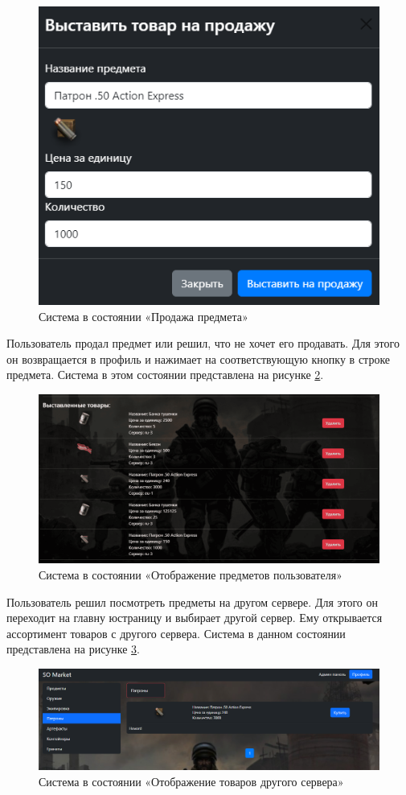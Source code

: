 \begin{figure}
	\centering
	\includegraphics[width=0.7\linewidth]{images/sell_on_web}
	\caption{Система в состоянии «Продажа предмета»}
	\label{fig:sellonweb}
\end{figure}

Пользователь продал предмет или решил, что не хочет его продавать. Для этого он возвращается в профиль и нажимает на соответствующую кнопку в строке предмета. Система в этом состоянии представлена на рисунке \ref{fig:profileitemweb}.

\begin{figure}[ht]
	\centering
	\includegraphics[width=0.7\linewidth]{images/profile_item_web}
	\caption{Система в состоянии «Отображение предметов пользователя»}
	\label{fig:profileitemweb}
\end{figure}

Пользователь решил посмотреть предметы на другом сервере. Для этого он переходит на главну юстраницу и выбирает другой сервер. Ему открывается ассортимент товаров с другого сервера. Система в данном состоянии представлена на рисунке \ref{fig:shopchangeweb}.

\begin{figure}[ht]
	\centering
	\includegraphics[width=0.7\linewidth]{images/shop_change_web}
	\caption{Система в состоянии «Отображение товаров другого сервера»}
	\label{fig:shopchangeweb}
\end{figure}

